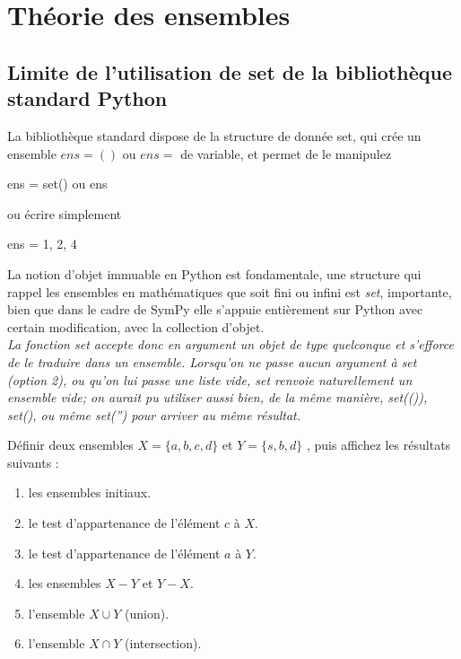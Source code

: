 \chapter{Théorie des ensembles}
\section{Limite de l'utilisation de set de la bibliothèque standard Python}
La bibliothèque standard dispose de la structure de donnée set, qui crée un ensemble $ens = ()$ ou $ens = {}$ de variable, et permet de le manipulez
\begin{python}
ens = set() ou ens 
\end{python}

ou écrire simplement 
\begin{python}
 ens = {1, 2, 4}
\end{python}
La notion d'objet immuable en Python est fondamentale,  une structure qui rappel les ensembles en mathématiques que soit fini ou infini est \textit{set}, importante, bien que dans le cadre de SymPy elle s'appuie entièrement sur Python avec certain modification, avec la collection d'objet.
\\

\textit{La fonction set accepte donc en argument un objet de type quelconque et s'efforce de le traduire dans un ensemble. Lorsqu'on ne passe aucun argument à set (option 2), ou qu'on lui passe une liste vide, set renvoie naturellement un ensemble vide; on aurait pu utiliser aussi bien, de la même manière, set(()), set({}), ou même set('') pour arriver au même résultat.}

\begin{exercise}
		Définir deux ensembles $X = \lbrace a, b, c, d\rbrace$ et  $Y = \lbrace s, b, d\rbrace$ , puis 			affichez les résultats suivants :
 		\begin{enumerate}
  			 \item les ensembles initiaux.
  			 \item le test d’appartenance de l’élément $c$ à $X$.
  			 \item le test d’appartenance de l’élément $a$ à $Y$.
  			 \item les ensembles $X - Y$ et $Y - X$.
  			 \item l’ensemble $X \cup Y$ (union).
  			 \item l'ensemble $X \cap Y$ (intersection).
	 \end{enumerate}
\end{exercise}

